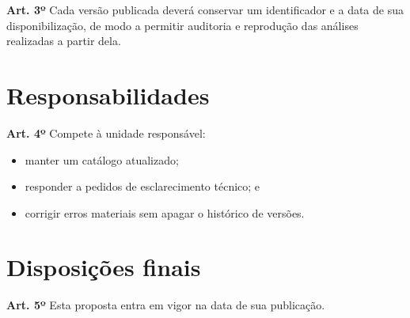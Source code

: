 \documentclass[12pt,a4paper]{br-lex}
\begin{document}
\textbf{Art. 3º} Cada versão publicada deverá conservar um identificador e a
data de sua disponibilização, de modo a permitir auditoria e reprodução das
análises realizadas a partir dela.

\section{Responsabilidades}
\textbf{Art. 4º} Compete à unidade responsável:
\begin{itemize}
  \item manter um catálogo atualizado;
  \item responder a pedidos de esclarecimento técnico; e
  \item corrigir erros materiais sem apagar o histórico de versões.
\end{itemize}

\section{Disposições finais}
\textbf{Art. 5º} Esta proposta entra em vigor na data de sua publicação.
\end{document}
